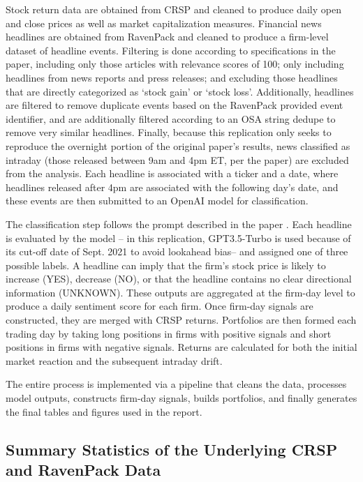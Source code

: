 \documentclass[12pt]{article}
\begin{document}
Stock return data are obtained from CRSP and cleaned to produce daily open and close prices as well as market capitalization measures. Financial news headlines are obtained from RavenPack and cleaned to produce a firm-level dataset of headline events. Filtering is done according to specifications in the paper, including only those articles with relevance scores of 100; only including headlines from news reports and press releases; and excluding those headlines that are directly categorized as `stock gain' or `stock loss'. Additionally, headlines are filtered to remove duplicate events based on the RavenPack provided event identifier, and are additionally filtered according to an OSA string dedupe to remove very similar headlines. Finally, because this replication only seeks to reproduce the overnight portion of the original paper's results, news classified as intraday (those released between 9am and 4pm ET, per the paper) are excluded from the analysis. Each headline is associated with a ticker and a date, where headlines released after 4pm are associated with the following day's date, and these events are then submitted to an OpenAI model for classification.

The classification step follows the prompt described in the paper \cite{LopezLiraTang2023}. Each headline is evaluated by the model -- in this replication, GPT3.5-Turbo is used because of its cut-off date of Sept. 2021 to avoid lookahead bias-- and assigned one of three possible labels. A headline can imply that the firm's stock price is likely to increase (YES), decrease (NO), or that the headline contains no clear directional information (UNKNOWN). These outputs are aggregated at the firm-day level to produce a daily sentiment score for each firm.
Once firm-day signals are constructed, they are merged with CRSP returns. Portfolios are then formed each trading day by taking long positions in firms with positive signals and short positions in firms with negative signals. Returns are calculated for both the initial market reaction and the subsequent intraday drift.

The entire process is implemented via a pipeline that cleans the data, processes model outputs, constructs firm-day signals, builds portfolios, and finally generates the final tables and figures used in the report.

\subsection{Summary Statistics of the Underlying CRSP and RavenPack Data}
\end{document}
